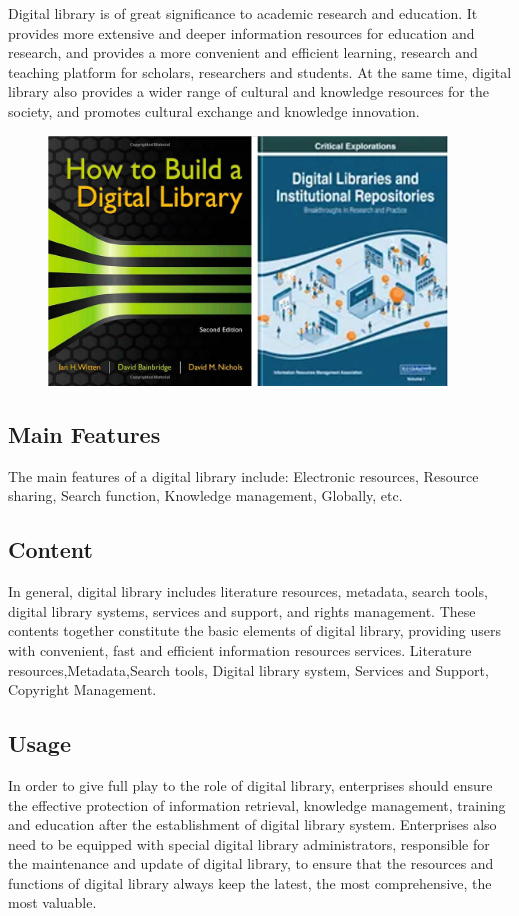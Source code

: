Digital library is of great significance to academic research and education. It provides more extensive and deeper information resources for education and research, and provides a more convenient and efficient learning, research and teaching platform for scholars, researchers and students. At the same time, digital library also provides a wider range of cultural and knowledge resources for the society, and promotes cultural exchange and knowledge innovation.

\begin{figure}[htbp]
  \centerline{\includegraphics[width=300pt]{images/M1-2-2.png}}
\end{figure}

\subsection{Main Features}
The main features of a digital library include:
Electronic resources, Resource sharing, Search function, Knowledge management, Globally, etc\cite{Internat75:online}.

\subsection{Content}
In general, digital library includes literature resources, metadata, search tools, digital library systems, services and support, and rights management. These contents together constitute the basic elements of digital library, providing users with convenient, fast and efficient information resources services.
Literature resources,Metadata,Search tools, Digital library system, Services and Support, Copyright Management.

\subsection{Usage}
In order to give full play to the role of digital library, enterprises should ensure the effective protection of information retrieval, knowledge management, training and education after the establishment of digital library system. Enterprises also need to be equipped with special digital library administrators, responsible for the maintenance and update of digital library, to ensure that the resources and functions of digital library always keep the latest, the most comprehensive, the most valuable.

